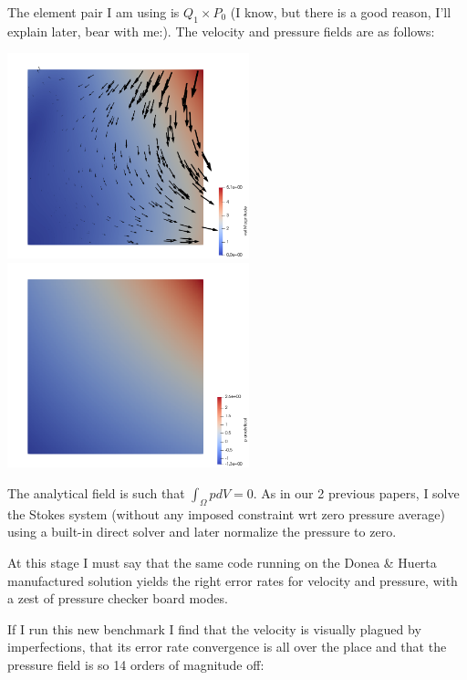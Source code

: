 \documentclass[a4paper,12pt]{article}
\begin{document}
The element pair I am using is $Q_1\times P_0$ (I know, but there is a good reason, I'll 
explain later, bear with me:).
The velocity and pressure fields are as follows:

\begin{center}
\includegraphics[width=7cm]{../results/exp09/vel.png}
\includegraphics[width=7cm]{../results/exp09/press.png}
\end{center}

The analytical field is such that $\int_\Omega p dV= 0$.
As in our 2 previous papers, I solve the Stokes system (without 
any imposed constraint wrt zero pressure average) using a built-in direct solver
and later normalize the pressure to zero.

At this stage I must say that the same code running on the Donea \& Huerta manufactured
solution yields the right error rates for velocity and pressure, with a zest of pressure 
checker board modes.

If I run this new benchmark I find that the velocity is visually plagued by imperfections, 
that its error rate convergence is all over the place and that the pressure field 
is so 14 orders of magnitude off:
\end{document}

